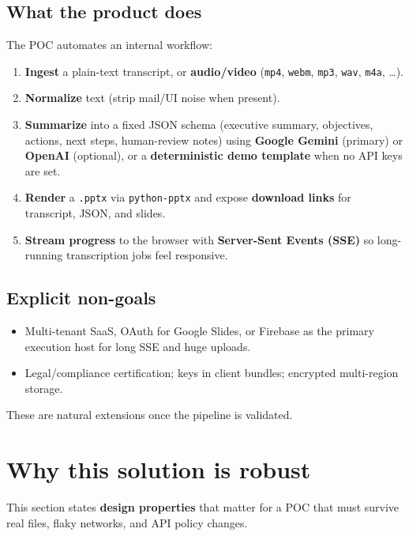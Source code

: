 \documentclass[11pt,a4paper]{article}
\begin{document}
\subsection{What the product does}
The POC automates an internal workflow:
\begin{enumerate}[label=\textbf{\arabic*.}]
  \item \textbf{Ingest} a plain-text transcript, or \textbf{audio/video} (\texttt{mp4}, \texttt{webm}, \texttt{mp3}, \texttt{wav}, \texttt{m4a}, \ldots).
  \item \textbf{Normalize} text (strip mail/UI noise when present).
  \item \textbf{Summarize} into a fixed JSON schema (executive summary, objectives, actions, next steps, human-review notes) using \textbf{Google Gemini} (primary) or \textbf{OpenAI} (optional), or a \textbf{deterministic demo template} when no API keys are set.
  \item \textbf{Render} a \texttt{.pptx} via \texttt{python-pptx} and expose \textbf{download links} for transcript, JSON, and slides.
  \item \textbf{Stream progress} to the browser with \textbf{Server-Sent Events (SSE)} so long-running transcription jobs feel responsive.
\end{enumerate}

\subsection{Explicit non-goals}
\begin{itemize}
  \item Multi-tenant SaaS, OAuth for Google Slides, or Firebase as the primary execution host for long SSE and huge uploads.
  \item Legal/compliance certification; keys in client bundles; encrypted multi-region storage.
\end{itemize}
These are natural extensions once the pipeline is validated.

\section{Why this solution is robust}

This section states \textbf{design properties} that matter for a POC that must survive real files, flaky networks, and API policy changes.
\end{document}
